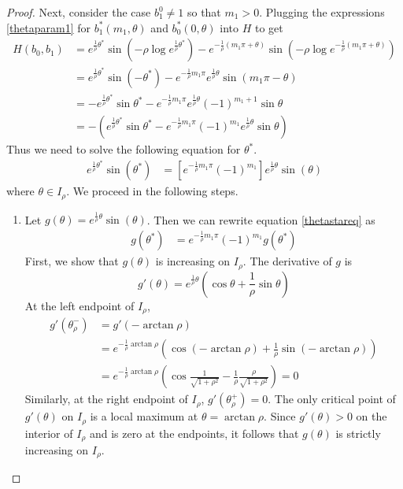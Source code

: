 \documentclass[thesis.tex]{subfiles}
\begin{document}
\begin{lemma}
\begin{proof}
Next, consider the case $b_1^0 \neq 1$ so that $m_1 > 0$. Plugging the expressions \eqref{thetaparam1} for $b_1^*(m_1, \theta)$ and $b_0^*(0, \theta)$ into $H$ to get
\begin{align*}
H(b_0, b_1) &= e^{ \frac{1}{\rho}\theta^* } \sin\left( -\rho \log e^{ \frac{1}{\rho}\theta^* }\right) - e^{ -\frac{1}{\rho}(m_1 \pi + \theta) }\sin \left( -\rho \log e^{ -\frac{1}{\rho}(m_1 \pi + \theta) } \right) \\
&= e^{ \frac{1}{\rho}\theta^* } \sin\left( -\theta^* \right) - e^{ -\frac{1}{\rho} m_1 \pi} e^{ \frac{1}{\rho} \theta } \sin(m_1 \pi - \theta) \\
&= -e^{ \frac{1}{\rho}\theta^* } \sin \theta^*  - e^{ -\frac{1}{\rho} m_1 \pi } e^{ \frac{1}{\rho} \theta } (-1)^{m_1 + 1} \sin\theta \\
&= -\left( e^{ \frac{1}{\rho}\theta^* } \sin \theta^* - e^{ -\frac{1}{\rho} m_1 \pi } (-1)^{m_1} e^{ \frac{1}{\rho} \theta } \sin \theta \right)
\end{align*}
Thus we need to solve the following equation for $\theta^*$.
\begin{align}\label{thetastareq}
e^{ \frac{1}{\rho}\theta^* } \sin\left( \theta^* \right) &= \left[ e^{ -\frac{1}{\rho} m_1 \pi } (-1)^{m_1} \right] e^{ \frac{1}{\rho} \theta } \sin(\theta)
\end{align}
where $\theta \in I_\rho$. We proceed in the following steps.
\begin{enumerate}
	\item Let $g(\theta) = e^{ \frac{1}{\rho} \theta } \sin(\theta)$. Then we can rewrite equation \eqref{thetastareq} as
	\begin{align}\label{thetastareq2}
	g(\theta^*) &= e^{ -\frac{1}{\rho} m_1 \pi } (-1)^{m_1} g(\theta^*)
	\end{align}
	First, we show that $g(\theta)$ is increasing on $I_\rho$. The derivative of $g$ is 
	\[
	g'(\theta) = e^{ \frac{1}{\rho} \theta } \left( \cos \theta + \frac{1}{\rho} \sin \theta \right)
	\]
	At the left endpoint of $I_\rho$,
	\begin{align*}
	g'(\theta_\rho^-) &= g'(-\arctan \rho) \\
	 &= e^{ -\frac{1}{\rho} \arctan \rho } \left(\cos(-\arctan \rho) + \frac{1}{\rho} \sin(-\arctan \rho)\right) \\
	&= e^{ -\frac{1}{\rho} \arctan \rho } \left(\cos\frac{1}{\sqrt{1 + \rho^2}} - \frac{1}{\rho} \frac{\rho}{\sqrt{1 + \rho^2}}\right) = 0
	\end{align*}
	Similarly, at the right endpoint of $I_\rho$, $g'(\theta_\rho^+) = 0$.
	The only critical point of $g'(\theta)$ on $I_\rho$ is a local maximum at $\theta = \arctan \rho$. Since $g'(\theta) > 0$ on the interior of $I_\rho$ and is zero at the endpoints, it follows that $g(\theta)$ is strictly increasing on $I_\rho$.
	

\end{enumerate}
\end{proof}
\end{lemma}
\end{document}
